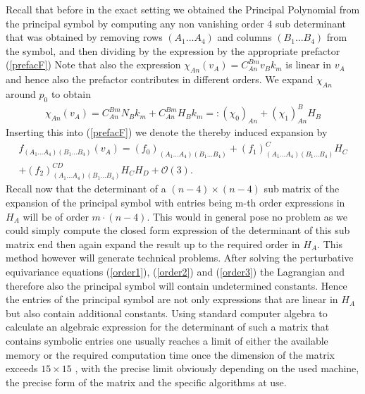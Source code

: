 \documentclass[a4paper,12pt, DIV=14, BCOR=5mm, twoside, headsepline, numbers=noenddot]{scrbook}
\begin{document}
Recall that before in the exact setting we obtained the Principal Polynomial from the principal symbol by computing any non vanishing order 4 sub determinant that was obtained by removing rows $(A_1...A_4)$ and columns $(B_1...B_4)$ from the symbol, and then dividing by the expression by the appropriate prefactor (\ref{prefacF})
Note that also the expression $\chi_{An}(v_A) = C_{An}^{Bm}v_Bk_m$ is linear in $v_A$ and hence also the prefactor contributes in different orders. We expand $\chi_{An}$ around $p_0$ to obtain
\begin{align}
\chi_{An}(v_A) =  C^{Bm}_{An} N_B k_m + C^{Bm}_{An} H_B k_m =: (\chi_0)_{An} + (\chi_1)^B_{An}H_B
\end{align}
Inserting this into (\ref{prefacF}) we denote the thereby induced expansion by
\begin{multline}\label{prefacExp}
    f_{(A_1...A_4)(B_1...B_4)}(v_A) = (f_0)_{(A_1...A_4)(B_1...B_4)} + (f_1)^C_{(A_1...A_4)(B_1...B_4)}H_C\\ + (f_2)^{CD}_{(A_1...A_4)(B_1...B_4)}H_CH_D
    + \mathcal{O}(3).
\end{multline}
Recall now that the determinant of a $(n-4) \times (n-4)$ sub matrix of the expansion of the principal symbol with entries being m-th order expressions in $H_A$ will be of order $m\cdot(n-4)$. This would in general pose no problem as we could simply compute the closed form expression of the determinant of this sub matrix end then again expand the result up to the required order in $H_A$. This method however will generate technical problems. After solving the perturbative equivariance equations (\ref{order1}), (\ref{order2}) and (\ref{order3}) the Lagrangian and therefore also the principal symbol will contain undetermined constants. Hence the entries of the principal symbol are not only expressions that are linear in $H_A$ but also contain additional constants. Using standard computer algebra to calculate an algebraic expression for the determinant of such a matrix that contains symbolic entries one usually reaches a limit of either the available memory or the required computation time once the dimension of the matrix exceeds $15 \times 15$ , with the precise limit obviously depending on the used machine, the precise form of the matrix and the specific algorithms at use. 
\end{document}
